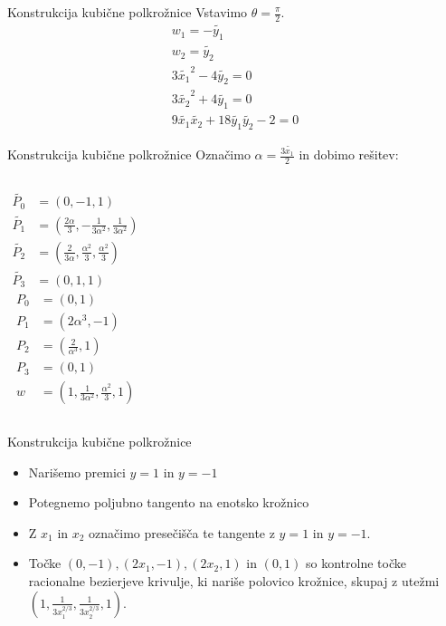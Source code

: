 \documentclass[t]{beamer}
\begin{document}
\begin{frame}{Konstrukcija kubične polkrožnice}
Vstavimo $\theta = \frac{\pi}{2}$.
\begin{align*}
w_{1} = - \tilde{y_{1}} \\
w_{2} = \tilde{y_{2}} \\
3\tilde{x_{1}}^2 - 4 \tilde{y_{2}} = 0 \\
3 \tilde{x_{2}}^2 + 4 \tilde{y_{1}} = 0 \\
9 \tilde{x_{1}} \tilde{x_{2}} + 18 \tilde{y_{1}} \tilde{y_{2}} - 2 = 0
\end{align*}
\end{frame}
\begin{frame}{Konstrukcija kubične polkrožnice}
Označimo $\alpha = \frac{3\tilde{x_{1}}}{2}$ in dobimo rešitev:

\begin{columns}
\begin{align*}
\tilde{P_{0}} &= (0,-1,1) \\
\tilde{P_{1}} &= (\frac{2\alpha}{3},-\frac{1}{3\alpha^2},\frac{1}{3\alpha^2}) \\
\tilde{P_{2}} &= (\frac{2}{3\alpha},\frac{\alpha^2}{3}, \frac{\alpha^2}{3}) \\
\tilde{P_{3}} &= (0, 1,1)
\end{align*}
\begin{align*}
P_{0} &= (0,1) \\
P_{1} &= (2\alpha^3, -1) \\
P_{2} &= (\frac{2}{\alpha^3}, 1) \\
P_{3} &= (0, 1) \\
w &= (1, \frac{1}{3\alpha^2}, \frac{\alpha^2}{3}, 1)
\end{align*}
\end{columns}

\end{frame}
\begin{frame}{Konstrukcija kubične polkrožnice}
\begin{itemize}
\item Narišemo premici $y=1$ in $y = -1$
\item Potegnemo poljubno tangento na enotsko krožnico
\item Z $x_{1}$ in $x_{2}$ označimo presečišča te tangente z $y=1$ in $y=-1$.
\item Točke $(0,-1), (2x_{1}, -1), (2x_{2}, 1)$ in $(0,1)$ so kontrolne točke racionalne bezierjeve krivulje, ki nariše polovico krožnice, skupaj z utežmi $(1, \frac{1}{3x_{1}^{2/3}}, \frac{1}{3x_{2}^{2/3}}, 1)$.

\end{itemize}
\end{frame}
\end{document}
